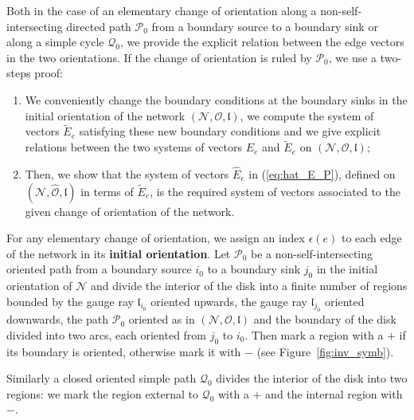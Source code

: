 \documentclass[11pt]{amsart}
\theoremstyle{plain}
\numberwithin{equation}{section}
\begin{document}
Both in the case of an elementary change of orientation along a non-self-intersecting directed path $\mathcal P_0$ from a boundary source to a boundary sink or along a simple cycle ${\mathcal Q}_0$, we provide the explicit relation between the edge vectors in the two orientations.
If the change of orientation is ruled by $\mathcal P_0$, we use a two-steps proof:
\begin{enumerate}
\item We conveniently change the boundary conditions at the boundary sinks in the initial orientation of the
network $({\mathcal N},\mathcal O,\mathfrak l)$, we compute the system of vectors ${\tilde E}_e$ satisfying these new boundary conditions and we give explicit relations between the two systems of vectors $E_e$ and  ${\tilde E}_e$ on $({\mathcal N},\mathcal O,\mathfrak l)$;
\item Then, we show that the system of vectors ${\hat E}_e$ in (\ref{eq:hat_E_P}), defined on $({\mathcal N},{\hat {\mathcal O}},\mathfrak l)$ in terms of ${\tilde E}_e$, is the required system of vectors associated to the given change of orientation of the network. 
\end{enumerate}

For any elementary change of orientation, we assign an index ${\epsilon}(e)$ to each edge of the network in its \textbf{initial orientation}.
Let $\mathcal P_0$ be a non-self-intersecting oriented path from a boundary source $i_0$ to a boundary sink $j_0$ in the initial orientation of ${\mathcal N}$ and divide the interior of the disk into a finite number of regions bounded by the gauge ray ${\mathfrak l}_{i_0}$ oriented 
upwards, the gauge ray ${\mathfrak l}_{j_0}$ oriented downwards, the path $\mathcal P_0$ oriented as in $({\mathcal N},\mathcal O,\mathfrak l)$ and the boundary 
of the disk divided into two arcs, each oriented from $j_0$ to $i_0$. Then mark a region with a $+$ if its boundary is
oriented, otherwise mark it with $-$ (see Figure~\ref{fig:inv_symb}).

\begin{figure}%
\end{figure}

Similarly a closed oriented simple path $\mathcal Q_0$ divides the interior of the disk into two regions: we mark the region external to $\mathcal Q_0$ with a $+$ and the internal region with $-$. 
\end{document}

